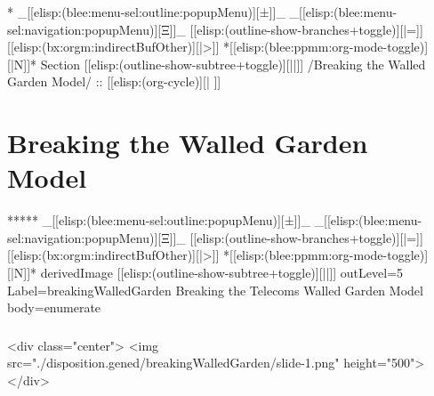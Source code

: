 
\begin{whenOrg}
*  _[[elisp:(blee:menu-sel:outline:popupMenu)][±]]_ _[[elisp:(blee:menu-sel:navigation:popupMenu)][Ξ]]_ [[elisp:(outline-show-branches+toggle)][|=]] [[elisp:(bx:orgm:indirectBufOther)][|>]] *[[elisp:(blee:ppmm:org-mode-toggle)][|N]]*  Section    [[elisp:(outline-show-subtree+toggle)][||]]   /Breaking the Walled Garden Model/ ::  [[elisp:(org-cycle)][| ]]
\end{whenOrg}

\section{Breaking the Walled Garden Model}

\begin{whenOrg}
*****  _[[elisp:(blee:menu-sel:outline:popupMenu)][±]]_ _[[elisp:(blee:menu-sel:navigation:popupMenu)][Ξ]]_ [[elisp:(outline-show-branches+toggle)][|=]] [[elisp:(bx:orgm:indirectBufOther)][|>]] *[[elisp:(blee:ppmm:org-mode-toggle)][|N]]*  derivedImage [[elisp:(outline-show-subtree+toggle)][||]] outLevel=5 Label=breakingWalledGarden Breaking the Telecoms Walled Garden Model body=enumerate
\end{whenOrg}

\begin{htmlonly}

\begin{frame}[fragile,plain,label=breakingWalledGarden]
    \frametitle{}
    \framesubtitle{}
    \begin{rawhtml}
<div class="center">
<img src="./disposition.gened/breakingWalledGarden/slide-1.png" height="500">
</div>
    \end{rawhtml}
\end{frame}
\end{htmlonly}

